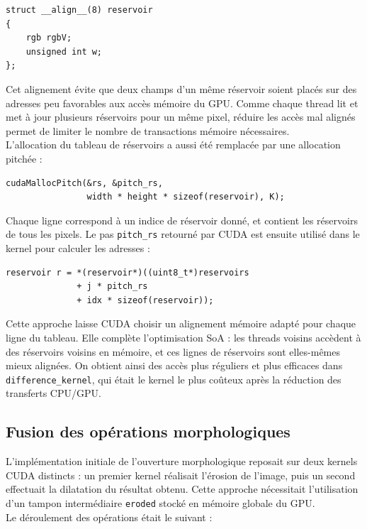 \documentclass[12pt]{article}
\begin{document}
    \begin{verbatim}
struct __align__(8) reservoir
{
    rgb rgbV;
    unsigned int w;
};
    \end{verbatim}

    Cet alignement évite que deux champs d'un même réservoir soient placés sur des adresses peu favorables aux accès mémoire du GPU. Comme chaque thread lit et met à jour plusieurs réservoirs pour un même pixel, réduire les accès mal alignés permet de limiter le nombre de transactions mémoire nécessaires.
    \\
    L'allocation du tableau de réservoirs a aussi été remplacée par une allocation pitchée :

    \begin{verbatim}
cudaMallocPitch(&rs, &pitch_rs,
                width * height * sizeof(reservoir), K);
    \end{verbatim}

    Chaque ligne correspond à un indice de réservoir donné, et contient les réservoirs de tous les pixels. Le pas \verb|pitch_rs| retourné par CUDA est ensuite utilisé dans le kernel pour calculer les adresses :

    \begin{verbatim}
reservoir r = *(reservoir*)((uint8_t*)reservoirs
              + j * pitch_rs
              + idx * sizeof(reservoir));
    \end{verbatim}

    Cette approche laisse CUDA choisir un alignement mémoire adapté pour chaque ligne du tableau. Elle complète l'optimisation SoA : les threads voisins accèdent à des réservoirs voisins en mémoire, et ces lignes de réservoirs sont elles-mêmes mieux alignées. On obtient ainsi des accès plus réguliers et plus efficaces dans \verb|difference_kernel|, qui était le kernel le plus coûteux après la réduction des transferts CPU/GPU.

    \subsection{Fusion des opérations morphologiques}

    L'implémentation initiale de l'ouverture morphologique reposait sur deux kernels CUDA distincts : un premier kernel réalisait l'érosion de l'image, puis un second effectuait la dilatation du résultat obtenu. Cette approche nécessitait l'utilisation d'un tampon intermédiaire \verb|eroded| stocké en mémoire globale du GPU.
    \\
    Le déroulement des opérations était le suivant :
\end{document}
